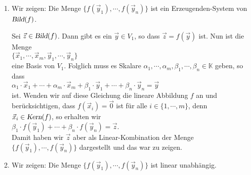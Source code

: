 \begin{enumerate}
\item Wir zeigen:
      Die Menge $\bigl\{ f(\vec{y}_1), \cdots, f(\vec{y}_n) \bigl\}$ ist ein Erzeugenden-System von $\textsl{Bild}(f)$.

      Sei $\vec{z} \in \textsl{Bild}(f)$.  Dann gibt es ein $\vec{y} \in V_1$, so dass $\vec{z} = f(\vec{y})$ ist.
      Nun ist die Menge
      \\[0.2cm]
      \hspace*{1.3cm}
      $\{ \vec{x}_1, \cdots, \vec{x}_m,  \vec{y}_1, \cdots, \vec{y}_n \}$ 
      \\[0.2cm]
      eine Basis von $V_1$. 
      Folglich muss es Skalare $\alpha_1, \cdots, \alpha_m, \beta_1, \cdots, \beta_n \in \mathbb{K}$ geben, so dass 
      \\[0.2cm]
      \hspace*{1.3cm}
      $\alpha_1 \cdot \vec{x}_1 + \cdots + \alpha_m \cdot \vec{x}_m + \beta_1 \cdot \vec{y}_1 + \cdots + \beta_n \cdot \vec{y}_n = \vec{y}$
      \\[0.2cm]
      ist.  Wenden wir auf diese Gleichung die lineare Abbildung $f$ an und ber\"{u}cksichtigen, dass
      $f(\vec{x}_i) = \vec{0}$ ist f\"{u}r alle $i \in \{1,\cdots,m\}$, denn $\vec{x}_i \in \textsl{Kern}(f)$, so erhalten wir
      \\[0.2cm]
      \hspace*{1.3cm}
      $\beta_1 \cdot f(\vec{y}_1) + \cdots + \beta_n \cdot f(\vec{y}_n) = \vec{z}$.
      \\[0.2cm]
      Damit haben wir $\vec{z}$ aber als Linear-Kombination der Menge  $\{ f(\vec{y}_1), \cdots, f(\vec{y}_n) \}$ 
      dargestellt und das war zu zeigen.
\item Wir zeigen: Die Menge $\bigl\{ f(\vec{y}_1), \cdots, f(\vec{y}_n) \bigr\}$ ist linear unabh\"{a}ngig.
  

\end{enumerate}
